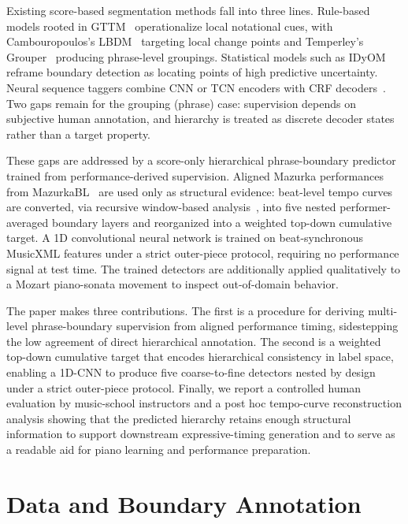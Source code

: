 \documentclass{article}
\begin{document}
Existing score-based segmentation methods fall into three lines. Rule-based models rooted in GTTM~\cite{LerdahlJackendoff1983} operationalize local notational cues, with Cambouropoulos's LBDM~\cite{Cambouropoulos2001LBDM} targeting local change points and Temperley's Grouper~\cite{Temperley2001Cognition} producing phrase-level groupings. Statistical models such as IDyOM~\cite{Pearce2010Melodic} reframe boundary detection as locating points of high predictive uncertainty. Neural sequence taggers combine CNN or TCN encoders with CRF decoders~\cite{Guan2018Melodic,Zhang2021SymbolicMelody,Jiang2022HierarchicalMetrical}. Two gaps remain for the grouping (phrase) case: supervision depends on subjective human annotation, and hierarchy is treated as discrete decoder states rather than a target property.

These gaps are addressed by a score-only hierarchical phrase-boundary predictor trained from performance-derived supervision. Aligned Mazurka performances from MazurkaBL~\cite{Kosta18MazurkaBL} are used only as structural evidence: beat-level tempo curves are converted, via recursive window-based analysis~\cite{Li2016ExpressiveTimingThesis}, into five nested performer-averaged boundary layers and reorganized into a weighted top-down cumulative target. A 1D convolutional neural network is trained on beat-synchronous MusicXML features under a strict outer-piece protocol, requiring no performance signal at test time. The trained detectors are additionally applied qualitatively to a Mozart piano-sonata movement to inspect out-of-domain behavior.

The paper makes three contributions. The first is a procedure for deriving multi-level phrase-boundary supervision from aligned performance timing, sidestepping the low agreement of direct hierarchical annotation. The second is a weighted top-down cumulative target that encodes hierarchical consistency in label space, enabling a 1D-CNN to produce five coarse-to-fine detectors nested by design under a strict outer-piece protocol. Finally, we report a controlled human evaluation by music-school instructors and a post hoc tempo-curve reconstruction analysis showing that the predicted hierarchy retains enough structural information to support downstream expressive-timing generation and to serve as a readable aid for piano learning and performance preparation.

\section{Data and Boundary Annotation}\label{sec:data}
\end{document}
